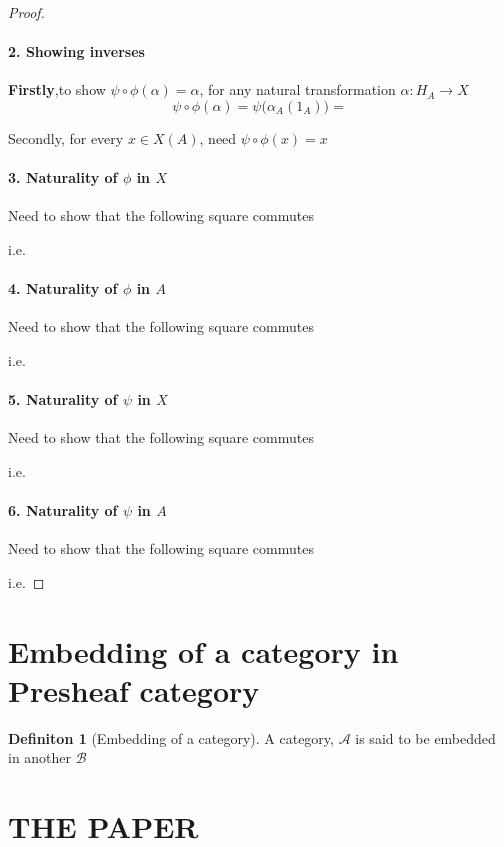 \documentclass[18pt,a4paper]{extarticle}
\theoremstyle{definition}
\theoremstyle{definition}
\newtheorem{definition}{Definiton}[section]
\begin{document}
\begin{proof}
	\paragraph {2. Showing inverses} \textbf{Firstly},to show $\psi \circ \phi (\alpha) = \alpha $,
	for any natural transformation $\alpha: H_A \to X$\\

	\[ \psi \circ \phi (\alpha) = \psi \Big(\alpha_A(1_A) \Big) =  \]

	Secondly, for every $x \in X(A)$, need $\psi \circ \phi (x) = x$

	\paragraph{3. Naturality of $\phi$ in $X$}
	Need to show that the following square commutes

	i.e.
	\paragraph{4. Naturality of $\phi$ in $A$}
	Need to show that the following square commutes

	i.e.
	\paragraph{5. Naturality of $\psi$ in $X$}
	Need to show that the following square commutes

	i.e.
	\paragraph{6. Naturality of $\psi$ in $A$}
	Need to show that the following square commutes

	i.e.

\end{proof}
\section{Embedding of a category in Presheaf category}%

\begin{definition}[Embedding of a category] %
A category, $\mathcal{A}$  is said to be embedded in another $\mathcal{B}$
\end{definition} %


\newpage
\section{THE PAPER}%

\end{document}
